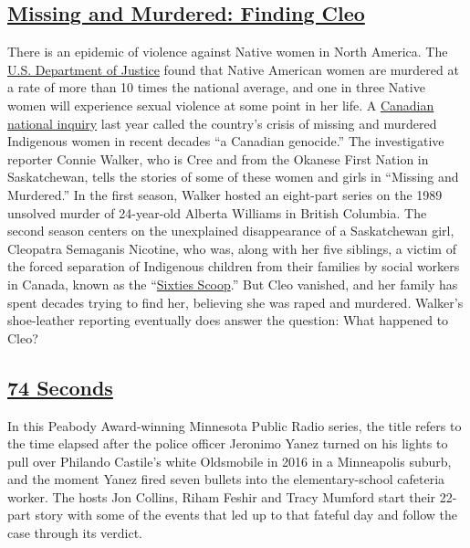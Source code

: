 \hypertarget{missing-and-murdered-finding-cleo}{%
\subsection{\texorpdfstring{\href{https://www.cbc.ca/radio/findingcleo}{Missing
and Murdered: Finding
Cleo}}{Missing and Murdered: Finding Cleo}}\label{missing-and-murdered-finding-cleo}}

There is an epidemic of violence against Native women in North America.
The
\href{https://www.justice.gov/archives/ovw/blog/protecting-native-american-and-alaska-native-women-violence-november-native-american}{U.S.
Department of Justice} found that Native American women are murdered at
a rate of more than 10 times the national average, and one in three
Native women will experience sexual violence at some point in her life.
A
\href{https://www.nytimes3xbfgragh.onion/2019/06/03/world/canada/canada-indigenous-genocide.html}{Canadian
national inquiry} last year called the country's crisis of missing and
murdered Indigenous women in recent decades ``a Canadian genocide.'' The
investigative reporter Connie Walker, who is Cree and from the Okanese
First Nation in Saskatchewan, tells the stories of some of these women
and girls in ``Missing and Murdered.'' In the first season, Walker
hosted an eight-part series on the 1989 unsolved murder of 24-year-old
Alberta Williams in British Columbia. The second season centers on the
unexplained disappearance of a Saskatchewan girl, Cleopatra Semaganis
Nicotine, who was, along with her five siblings, a victim of the forced
separation of Indigenous children from their families by social workers
in Canada, known as the
``\href{https://www.nytimes3xbfgragh.onion/2017/10/06/world/canada/indigenous-forced-adoption-sixties-scoop.html}{Sixties
Scoop}.'' But Cleo vanished, and her family has spent decades trying to
find her, believing she was raped and murdered. Walker's shoe-leather
reporting eventually does answer the question: What happened to Cleo?

\hypertarget{74-seconds}{%
\subsection{\texorpdfstring{\href{https://www.mprnews.org/story/2018/04/24/74-seconds-podcast-peabody-mpr-news}{74
Seconds}}{74 Seconds}}\label{74-seconds}}

In this Peabody Award-winning Minnesota Public Radio series, the title
refers to the time elapsed after the police officer Jeronimo Yanez
turned on his lights to pull over Philando Castile's white Oldsmobile in
2016 in a Minneapolis suburb, and the moment Yanez fired seven bullets
into the elementary-school cafeteria worker. The hosts Jon Collins,
Riham Feshir and Tracy Mumford start their 22-part story with some of
the events that led up to that fateful day and follow the case through
its verdict.


